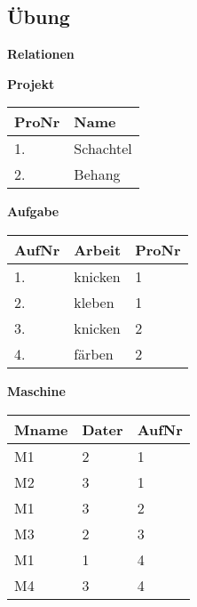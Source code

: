 \subsection{Übung}
\begin{table}[H]
    \centering
    \textbf{Relationen} \\ [10pt]
    \begin{minipage}[t]{0.3\textwidth}
        \centering
        \textbf{Projekt} \\[3pt]
        \begin{tabularx}{\linewidth}{|X|X|}
            \hline
            \textbf{ProNr} & \textbf{Name} \\
            \hline
            1. & Schachtel \\
            \hline
            2. & Behang \\
            \hline
        \end{tabularx}
    \end{minipage}
    \hspace{0.3cm}
    \begin{minipage}[t]{0.3\textwidth}
        \centering
        \textbf{Aufgabe} \\ [3pt]

        \begin{tabularx}{\linewidth}{|X|X|X|}
            \hline
            \textbf{AufNr} & \textbf{Arbeit} & \textbf{ProNr} \\
            \hline
            1. & knicken    & 1 \\
            2. & kleben     & 1 \\
            3. & knicken    & 2\\
            4. & färben     & 2 \\
            \hline
        \end{tabularx}
    \end{minipage}
    \hspace{0.3cm}
    \begin{minipage}[t]{0.3\textwidth}
        \centering
        \textbf{Maschine} \\ [3pt]

        \begin{tabularx}{\linewidth}{|X|X|X|}
            \hline
            \textbf{Mname} & \textbf{Dater} & \textbf{AufNr} \\
            \hline
            M1 & 2    & 1 \\
            M2 & 3    & 1 \\
            M1 & 3    & 2\\
            M3 & 2    & 3 \\
            M1 & 1    & 4 \\
            M4 & 3    & 4 \\
            \hline
        \end{tabularx}
    \end{minipage}
\end{table}

